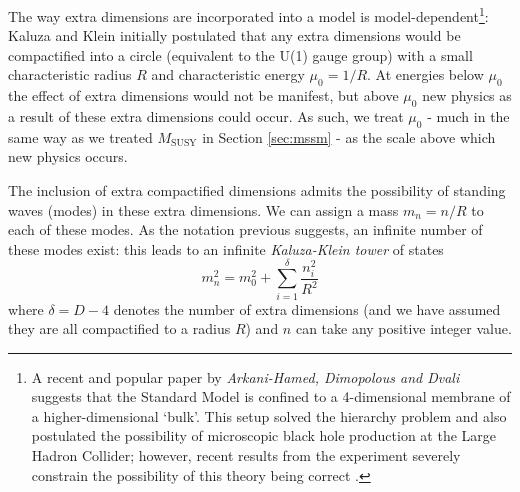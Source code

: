 \documentclass[12pt,a4paper,oneside]{article}
\begin{document}
The way extra dimensions are incorporated into a model is model-dependent\footnote{A recent and popular paper by \textit{Arkani-Hamed, Dimopolous and Dvali} \cite{ed-1} suggests that the Standard Model is confined to a 4-dimensional membrane of a higher-dimensional `bulk'. This setup solved the hierarchy problem and also postulated the possibility of microscopic black hole production at the Large Hadron Collider; however, recent results from the experiment severely constrain the possibility of this theory being correct \cite{black-holes-lhc}.}: Kaluza and Klein initially postulated that any extra dimensions would be compactified into a circle (equivalent to the U(1) gauge group) with a small characteristic radius $R$ and characteristic energy $\mu_0 = 1 / R$. At energies below $\mu_0$ the effect of extra dimensions would not be manifest, but above $\mu_0$ new physics as a result of these extra dimensions could occur. As such, we treat $\mu_0$ - much in the same way as we treated $M_\mathrm{SUSY}$ in Section \ref{sec:mssm} - as the scale above which new physics occurs.

The inclusion of extra compactified dimensions admits the possibility of standing waves (modes) in these extra dimensions. We can assign a mass $m_n = n/R$ to each of these modes. As the notation previous suggests, an infinite number of these modes exist: this leads to an infinite \textit{Kaluza-Klein tower} of states
\[
m_n^2 = m_0^2 + \sum_{i=1}^{\delta} \frac{n_i^2}{R^2}
\]
where $\delta = D-4$ denotes the number of extra dimensions (and we have assumed they are all compactified to a radius $R$) and $n$ can take any positive integer value. 
\end{document}
